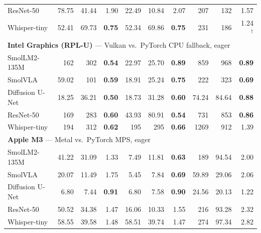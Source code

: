 \begin{tabular}{l rrr rrr rrr}
ResNet-50 & 78.75 & 41.44 & 1.90 & 22.49 & 10.84 & 2.07 & 207 & 132 & 1.57 \\
Whisper-tiny & 52.41 & 69.73 & \textbf{0.75} & 52.34 & 69.86 & \textbf{0.75} & 231 & 186 & 1.24$^\dagger$ \\
\midrule
\multicolumn{10}{l}{\textbf{Intel Graphics (RPL-U)} --- \system{} Vulkan vs.\ PyTorch CPU fallback, eager} \\
SmolLM2-135M & 162 & 302 & \textbf{0.54} & 22.97 & 25.70 & \textbf{0.89} & 859 & 968 & \textbf{0.89} \\
SmolVLA & 59.02 & 101 & \textbf{0.59} & 18.91 & 25.24 & \textbf{0.75} & 222 & 323 & \textbf{0.69} \\
Diffusion U-Net & 18.25 & 36.21 & \textbf{0.50} & 18.73 & 31.28 & \textbf{0.60} & 74.24 & 84.64 & \textbf{0.88} \\
ResNet-50 & 169 & 283 & \textbf{0.60} & 43.93 & 80.91 & \textbf{0.54} & 731 & 853 & \textbf{0.86} \\
Whisper-tiny & 194 & 312 & \textbf{0.62} & 195 & 295 & \textbf{0.66} & 1269 & 912 & 1.39 \\
\midrule
\multicolumn{10}{l}{\textbf{Apple M3} --- \system{} Metal vs.\ PyTorch MPS, eager} \\
SmolLM2-135M & 41.22 & 31.09 & 1.33 & 7.49 & 11.81 & \textbf{0.63} & 189 & 94.54 & 2.00 \\
SmolVLA & 20.07 & 11.49 & 1.75 & 5.45 & 7.84 & \textbf{0.69} & 59.89 & 29.06 & 2.06 \\
Diffusion U-Net & 6.80 & 7.44 & \textbf{0.91} & 6.80 & 7.58 & \textbf{0.90} & 24.56 & 20.13 & 1.22 \\
ResNet-50 & 50.52 & 34.38 & 1.47 & 16.06 & 10.33 & 1.55 & 216 & 93.28 & 2.32 \\
Whisper-tiny & 58.55 & 39.58 & 1.48 & 58.51 & 39.74 & 1.47 & 274 & 97.34 & 2.82 \\
\bottomrule
\end{tabular}
